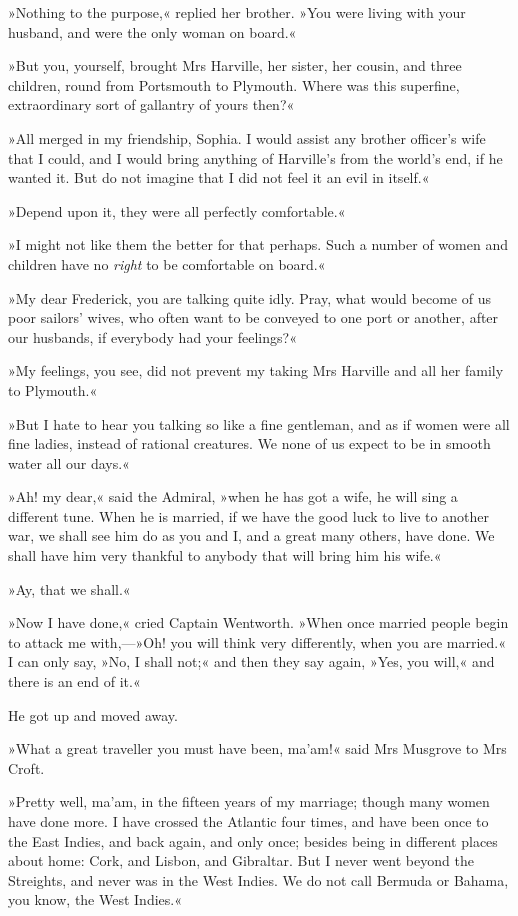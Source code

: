 »Nothing to the purpose,« replied her brother. »You were living with your husband, and were the only woman on board.«

»But you, yourself, brought Mrs Harville, her sister, her cousin, and three children, round from Portsmouth to Plymouth. Where was this superfine, extraordinary sort of gallantry of yours then?«

»All merged in my friendship, Sophia. I would assist any brother officer's wife that I could, and I would bring anything of Harville's from the world's end, if he wanted it. But do not imagine that I did not feel it an evil in itself.«

»Depend upon it, they were all perfectly comfortable.«

»I might not like them the better for that perhaps. Such a number of women and children have no \textit{right} to be comfortable on board.«

»My dear Frederick, you are talking quite idly. Pray, what would become of us poor sailors' wives, who often want to be conveyed to one port or another, after our husbands, if everybody had your feelings?«

»My feelings, you see, did not prevent my taking Mrs Harville and all her family to Plymouth.«

»But I hate to hear you talking so like a fine gentleman, and as if women were all fine ladies, instead of rational creatures. We none of us expect to be in smooth water all our days.«

»Ah! my dear,« said the Admiral, »when he has got a wife, he will sing a different tune. When he is married, if we have the good luck to live to another war, we shall see him do as you and I, and a great many others, have done. We shall have him very thankful to anybody that will bring him his wife.«

»Ay, that we shall.«

»Now I have done,« cried Captain Wentworth. »When once married people begin to attack me with,—»Oh! you will think very differently, when you are married.« I can only say, »No, I shall not;« and then they say again, »Yes, you will,« and there is an end of it.«

He got up and moved away.

»What a great traveller you must have been, ma'am!« said Mrs Musgrove to Mrs Croft.

»Pretty well, ma'am, in the fifteen years of my marriage; though many women have done more. I have crossed the Atlantic four times, and have been once to the East Indies, and back again, and only once; besides being in different places about home: Cork, and Lisbon, and Gibraltar. But I never went beyond the Streights, and never was in the West Indies. We do not call Bermuda or Bahama, you know, the West Indies.«

